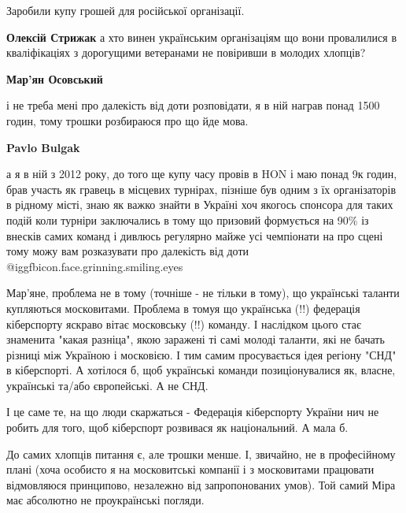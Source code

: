 \begin{itemize}
\begin{itemize}
\begin{itemize}
\end{itemize} %

Заробили купу грошей для російської організації.

\begin{itemize} %
\textbf{Олексій Стрижак} а хто винен українським організаціям що вони провалилися в кваліфікаціях з дорогущими ветеранами не повіривши в молодих хлопців?
\end{itemize} %

\textbf{Мар'ян Осовський} 

і не треба мені про далекість від доти розповідати, я в ній награв понад 1500
годин, тому трошки розбираюся про що йде мова.

\begin{itemize} %
\textbf{Pavlo Bulgak} 

а я в ній з 2012 року, до того ще купу часу провів в HON і маю понад 9к годин,
брав участь як гравець в місцевих турнірах, пізніше був одним з їх
організаторів в рідному місті, знаю як важко знайти в Україні хоч якогось
спонсора для таких подій коли турніри заключались в тому що призовий формується
на 90\% із внесків самих команд і дивлюсь регулярно майже усі чемпіонати на про
сцені тому можу вам розказувати про далекість від доти  @igg{fbicon.face.grinning.smiling.eyes} 

\end{itemize} %


Мар'яне, проблема не в тому (точніше - не тільки в тому), що українські таланти
купляються московитами. Проблема в томуя що українська (!!) федерація
кіберспорту яскраво вітає московську (!!) команду. І наслідком цього стає
знаменита "какая разніца", якою заражені ті самі молоді таланти, які не бачать
різниці між Україною і московією. І тим самим просувається ідея регіону "СНД" в
кіберспорті. А хотілося б, щоб українські команди позиціонувалися як, власне,
українські та/або європейські. А не СНД.

І це саме те, на що люди скаржаться - Федерація кіберспорту України нич не
робить для того, щоб кіберспорт розвивася як національний. А мала б.

До самих хлопців питання є, але трошки менше. І, звичайно, не в професійному
плані (хоча особисто я на московитські компанії і з московитами працювати
відмовляюся принципово, незалежно від запропонованих умов). Той самий Міра має
абсолютно не проукраїнські погляди.


\end{itemize}
\end{itemize}
